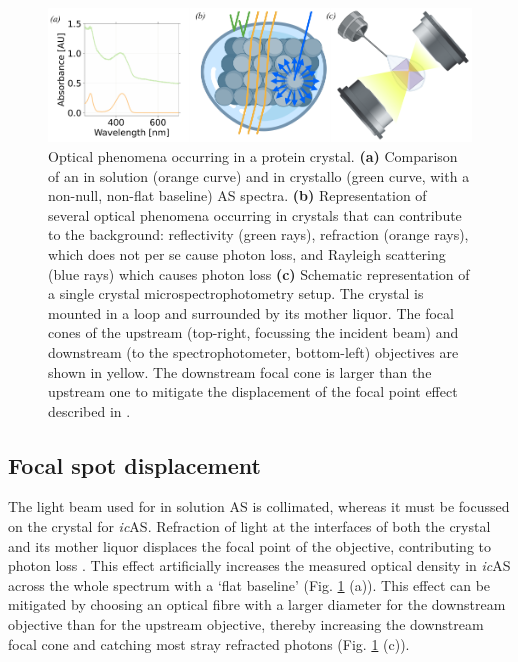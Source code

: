 \begin{figure}[H] %
    \centering
    \noindent \includegraphics[width=\textwidth]{images/Spectroscopy/icOS_toolbox_Fig.1.pdf}
    \hfill
    \caption{Optical phenomena occurring in a protein crystal. \textbf{(a)} Comparison of an in solution (orange curve) and in crystallo (green curve, with a non-null, non-flat baseline) AS spectra. \textbf{(b)} Representation of several optical phenomena occurring in crystals that can contribute to the background: reflectivity (green rays), refraction (orange rays), which does not per se cause photon loss, and Rayleigh scattering (blue rays) which causes photon loss \textbf{(c)} Schematic representation of a single crystal microspectrophotometry setup. The crystal is mounted in a loop and surrounded by its mother liquor. The focal cones of the upstream (top-right, focussing the incident beam) and downstream (to the spectrophotometer, bottom-left) objectives are shown in yellow. The downstream focal cone is larger than the upstream one to mitigate the displacement of the focal point effect described in \cite{vonstettenCrystalloOpticalSpectroscopy2015}.}
    \label{fig:toolbox_phenomena}
\end{figure}
\subsection{Focal spot displacement}

The light beam used for in solution AS is collimated, whereas it must be focussed on the crystal for \textit{ic}AS. Refraction of light at the interfaces of both the crystal and its mother liquor displaces the focal point of the objective, contributing to photon loss \parencite{vonstettenCrystalloOpticalSpectroscopy2015}. This effect artificially increases the measured optical density in \textit{ic}AS across the whole spectrum with a ‘flat baseline’ (Fig. \ref{fig:toolbox_phenomena} (a)). This effect can be mitigated by choosing an optical fibre with a larger diameter for the downstream objective than for the upstream objective, thereby increasing the downstream focal cone and catching most stray refracted photons (Fig. \ref{fig:toolbox_phenomena} (c)). 

